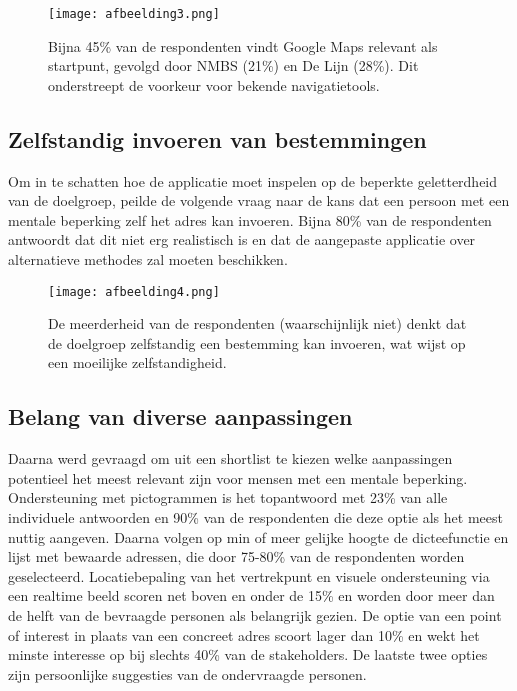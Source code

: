 \begin{figure}[h]
    \centering
    \texttt{[image: afbeelding3.png]}
    \caption{Bijna 45\% van de respondenten vindt Google Maps relevant als startpunt, gevolgd door NMBS (21\%) en De Lijn (28\%). Dit onderstreept de voorkeur voor bekende navigatietools.}
    \label{fig:relevantie}
\end{figure}

\subsection*{Zelfstandig invoeren van bestemmingen}
Om in te schatten hoe de applicatie moet inspelen op de beperkte geletterdheid van de doelgroep, peilde de volgende vraag naar de kans dat een persoon met een mentale beperking zelf het adres kan invoeren. Bijna 80\% van de respondenten antwoordt dat dit niet erg realistisch is en dat de aangepaste applicatie over alternatieve methodes zal moeten beschikken.

\begin{figure}[h]
    \centering
    \texttt{[image: afbeelding4.png]}
    \caption{De meerderheid van de respondenten (waarschijnlijk niet) denkt dat de doelgroep zelfstandig een bestemming kan invoeren, wat wijst op een moeilijke zelfstandigheid.}
    \label{fig:potentieeldoelgroep}
\end{figure}

\subsection*{Belang van diverse aanpassingen}
Daarna werd gevraagd om uit een shortlist te kiezen welke aanpassingen potentieel het meest relevant zijn voor mensen met een mentale beperking. Ondersteuning met pictogrammen is het topantwoord met 23\% van alle individuele antwoorden en 90\% van de respondenten die deze optie als het meest nuttig aangeven. Daarna volgen op min of meer gelijke hoogte de dicteefunctie en lijst met bewaarde adressen, die door 75-80\% van de respondenten worden geselecteerd. Locatiebepaling van het vertrekpunt en visuele ondersteuning via een realtime beeld scoren net boven en onder de 15\% en worden door meer dan de helft van de bevraagde personen als belangrijk gezien. De optie van een point of interest in plaats van een concreet adres scoort lager dan 10\% en wekt het minste interesse op bij slechts 40\% van de stakeholders. De laatste twee opties zijn persoonlijke suggesties van de ondervraagde personen.

